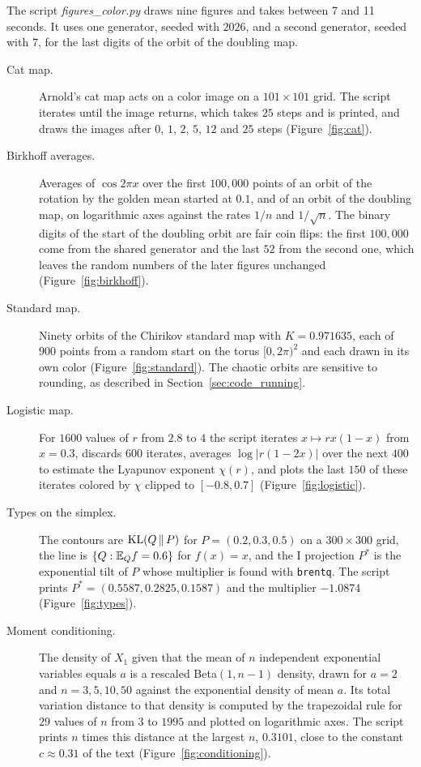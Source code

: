 \begin{description}
\end{description}

The script \textit{figures\_color.py} draws nine figures and takes between 7 and 11 seconds. It uses one generator, seeded with $2026$, and a second generator, seeded with $7$, for the last digits of the orbit of the doubling map.

\begin{description}
\item[Cat map.] Arnold's cat map acts on a color image on a $101\times101$ grid. The script iterates until the image returns, which takes $25$ steps and is printed, and draws the images after $0$, $1$, $2$, $5$, $12$ and $25$ steps (Figure~\ref{fig:cat}).
\item[Birkhoff averages.] Averages of $\cos2\pi x$ over the first $100{,}000$ points of an orbit of the rotation by the golden mean started at $0.1$, and of an orbit of the doubling map, on logarithmic axes against the rates $1/n$ and $1/\sqrt n$. The binary digits of the start of the doubling orbit are fair coin flips: the first $100{,}000$ come from the shared generator and the last $52$ from the second one, which leaves the random numbers of the later figures unchanged (Figure~\ref{fig:birkhoff}).
\item[Standard map.] Ninety orbits of the Chirikov standard map with $K=0.971635$, each of $900$ points from a random start on the torus $[0,2\pi)^2$ and each drawn in its own color (Figure~\ref{fig:standard}). The chaotic orbits are sensitive to rounding, as described in Section~\ref{sec:code_running}.
\item[Logistic map.] For $1600$ values of $r$ from $2.8$ to $4$ the script iterates $x\mapsto rx(1-x)$ from $x=0.3$, discards $600$ iterates, averages $\log|r(1-2x)|$ over the next $400$ to estimate the Lyapunov exponent $\chi(r)$, and plots the last $150$ of these iterates colored by $\chi$ clipped to $[-0.8,0.7]$ (Figure~\ref{fig:logistic}).
\item[Types on the simplex.] The contours are $\mathrm{KL}(Q\,\|\,P)$ for $P=(0.2,0.3,0.5)$ on a $300\times300$ grid, the line is $\{Q:\mathbb{E}_Qf=0.6\}$ for $f(x)=x$, and the I projection $P^*$ is the exponential tilt of $P$ whose multiplier is found with \texttt{brentq}. The script prints $P^*=(0.5587,0.2825,0.1587)$ and the multiplier $-1.0874$ (Figure~\ref{fig:types}).
\item[Moment conditioning.] The density of $X_1$ given that the mean of $n$ independent exponential variables equals $a$ is a rescaled Beta$(1,n-1)$ density, drawn for $a=2$ and $n=3,5,10,50$ against the exponential density of mean $a$. Its total variation distance to that density is computed by the trapezoidal rule for $29$ values of $n$ from $3$ to $1995$ and plotted on logarithmic axes. The script prints $n$ times this distance at the largest $n$, $0.3101$, close to the constant $c\approx0.31$ of the text (Figure~\ref{fig:conditioning}).

\end{description}
